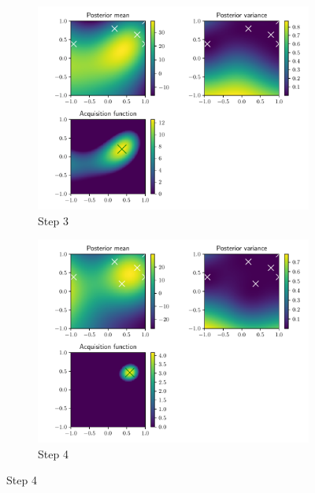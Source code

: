 \documentclass[10pt,a4paper,twoside]{book}
\begin{document}
\begin{figure}
	\begin{subfigure}[b]{0.45\textwidth}
		\caption{Step 3}
		\includegraphics[width=\textwidth]{figures/chapter3/rosen/2.pdf}
	\end{subfigure}
	\begin{subfigure}[b]{0.45\textwidth}
		\caption{Step 4}
		\includegraphics[width=\textwidth]{figures/chapter3/rosen/3.pdf}
	\end{subfigure}
	

\end{figure}
\end{document}
